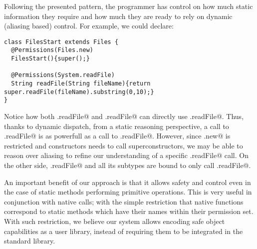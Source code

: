 \documentclass[a4paper,twoside,british,9pt]{extarticle}
\begin{document}
 Following the
presented pattern, the programmer has control on how much static information
they require and how much they are ready to rely on dynamic (aliasing
based) control. For example, we could declare:

\begin{lstlisting}
class FilesStart extends Files {
  @Permissions(Files.new)
  FilesStart(){super();}

  @Permissions(System.readFile)
  String readFile(String fileName){return super.readFile(fileName).substring(0,10);}
}
\end{lstlisting}
Notice how both \Q@Files.readFile@
and \Q@FilesStart.readFile@
can directly use \Q@System.readFile@.
Thus, thanks to dynamic dispatch, from a static reasoning perspective, a call to
\Q@Files.readFile@ is as powerfull as a call
to \Q@System.readFile@.
However, since \Q@Files.new@ is restricted and
constructors needs to call superconstructors, we may be able to reason over aliasing to refine our understanding of a specific  
\Q@Files.readFile@ call.
On the other side, \Q@DocFiles.readFile@ and all its subtypes are bound to
only call \Q@Documents.readFile@.

An important benefit of our approach is that it allows safety and
control even in the case of static methods performing primitive operations.
This is very useful in conjunction with native calls; with the simple restriction
that native functions correspond to static methods which have their names within their permission set.
With such restriction, we believe our system allows encoding safe object capabilities as
a user library, instead of requiring them to be integrated in the
standard library. 
\end{document}
